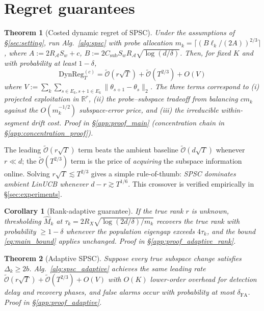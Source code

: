 \documentclass{article}
\newcommand{\R}{\mathbb{R}}
\newcommand{\cA}{\mathcal{A}}
\newcommand{\tilO}{\widetilde{\mathcal{O}}}
\newcommand{\DynReg}{\mathrm{DynReg}}
\newtheorem{theorem}{Theorem}
\newtheorem{corollary}{Corollary}
\begin{document}
\section{Regret guarantees}
\label{sec:theory}

\begin{theorem}[Costed dynamic regret of SPSC]
\label{thm:spsc_regret}
Under the assumptions of \S\ref{sec:setting}, run Alg.~\ref{alg:spsc}
with probe allocation $m_k = \lceil (B\ell_k/(2A))^{2/3}\rceil$, where
$A := 2R_\cA S_w + c$, $B := 2 C_{\mathrm{sub}} S_w R_\cA \sqrt{\log(d/\delta)}$.
Then, for fixed $K$ and with probability at least $1-\delta$,
\begin{equation}
\boxed{\;
\DynReg_T^{(c)} = \tilO(r\sqrt{T}) + \tilO(T^{2/3}) + O(V)\;}
\label{eq:main_bound}
\end{equation}
where $V := \sum_k \sum_{s\in E_k, s+1\in E_k}\|\theta_{s+1}-\theta_s\|_2$.
The three terms correspond to (i) projected exploitation in $\R^r$,
(ii) the probe--subspace tradeoff from balancing $cm_k$ against the
$O(m_k^{-1/2})$ subspace-error price, and (iii) the irreducible
within-segment drift cost.
Proof in \S\ref{app:proof_main} (concentration chain in
\S\ref{app:concentration_proof}).
\end{theorem}

The leading $\tilO(r\sqrt{T})$ term beats the ambient baseline
$\tilO(d\sqrt{T})$ whenever $r \ll d$; the $\tilO(T^{2/3})$ term is
the price of \emph{acquiring} the subspace information online.
Solving $r\sqrt{T}\lesssim T^{2/3}$ gives a simple rule-of-thumb:
\emph{SPSC dominates ambient LinUCB whenever $d - r \gtrsim T^{1/6}$}.
This crossover is verified empirically in \S\ref{sec:experiments}.

\begin{corollary}[Rank-adaptive guarantee]
\label{cor:rank_adaptive}
If the true rank $r$ is unknown, thresholding $\widehat M_k$
at $\tau_k = 2R_X\sqrt{\log(2d/\delta)/m_k}$ recovers the true rank
with probability $\ge 1-\delta$ whenever the population eigengap
exceeds $4\tau_k$, and the bound \eqref{eq:main_bound} applies
unchanged. Proof in \S\ref{app:proof_adaptive_rank}.
\end{corollary}

\begin{theorem}[Adaptive SPSC]
\label{thm:spsc_adaptive}
Suppose every true subspace change satisfies $\Delta_k \ge 2b$.
Alg.~\ref{alg:spsc_adaptive} achieves the same leading rate
$\tilO(r\sqrt{T}) + \tilO(T^{2/3}) + O(V)$
with $O(K)$ lower-order overhead for detection delay and recovery
phases, and false alarms occur with probability at most
$\delta_{\mathrm{FA}}$. Proof in \S\ref{app:proof_adaptive}.
\end{theorem}
\end{document}

